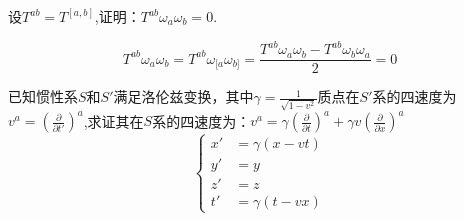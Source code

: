 \documentclass{assignment}
\begin{document}
    \begin{prob}
    设$T^{ab}=T^{[a,b]}$,证明：$T^{ab}\omega_{a}\omega_b = 0$.
    \end{prob}
    \begin{sol}
    \begin{equation}
        T^{ab}\omega_{a}\omega_b = T^{ab}\omega_{[a}\omega_{b]} = \frac{T^{ab}\omega_{a}\omega_{b} - T^{ab}\omega_{b}\omega_{a}}{2} = 0
    \end{equation}
    \end{sol}
    \begin{prob}
        已知惯性系$S$和$S'$满足洛伦兹变换，其中$\gamma = \frac{1}{\sqrt{1-v^2}}$质点在$S'$系的四速度为$v^a = (\frac{\partial}{\partial t'})^a$,求证其在$S$系的四速度为：$v^a = \gamma (\frac{\partial}{\partial t})^a + \gamma v (\frac{\partial}{\partial x})^a$
        \begin{equation}
            \left\{
            \begin{aligned}
                x' &= \gamma (x - vt) \\
                y' &= y \\
                z' &= z \\
                t' &= \gamma (t - vx)
            \end{aligned}
            \right.
        \end{equation}
    \end{prob}
\end{document}
